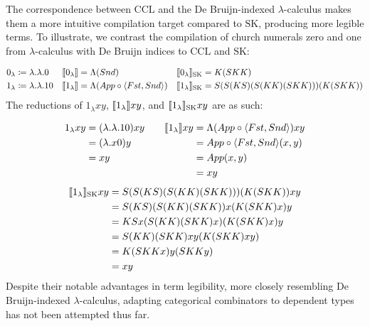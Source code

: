 \documentclass{article}
\newcommand{\ccl}{\(\text{CCL}\)} %
\newcommand{\sk}{\(\text{SK}\)}
\newcommand{\ske}{\text{SK}}
\newcommand{\la}{\langle}
\newcommand{\ra}{\rangle}
\begin{document}
The correspondence between \ccl{} and the De Bruijn-indexed \(\lambda\)-calculus makes them a more intuitive compilation target compared to \sk{}, producing more legible terms. To illustrate, we contrast the compilation of church numerals zero and one from \(\lambda\)-calculus with De Bruijn indices to \ccl{} and \sk{}:

\begin{align*}
  0_{\lambda} &\coloneq \lambda . \lambda . 0 & \cc{0_{\lambda}} &= \Lambda(Snd) & \cc[\ske]{0_{\lambda}} &= K (S K K)\\
  1_{\lambda} &\coloneq \lambda . \lambda . 1 0 & \cc{1_{\lambda}} &= \Lambda(App \circ \la Fst, Snd \ra) & \cc[\ske]{1_{\lambda}} &= S (S (K S) (S (K K) (S K K))) (K (S K K))
\end{align*}
The reductions of \(1_{\lambda} x y\), \(\cc{1_{\lambda}} x y\), and \(\cc[\ske]{1_{\lambda}} x y\) are as such:

\begin{equation*}
  \begin{aligned}[t]
    1_{\lambda} x y &= (\lambda . \lambda . 1 0) x y\\
    &= (\lambda . x 0) y\\
    &= x y
  \end{aligned}
  \qquad
  \begin{aligned}[t]
    \cc{1_{\lambda}} x y &= \Lambda(App \circ \la Fst, Snd \ra) x y\\
    &= App \circ \la Fst, Snd \ra (x, y)\\
    &= App (x, y)\\
    &= x y
  \end{aligned}
\end{equation*}
\begin{equation*}
  \begin{aligned}[t]
    \cc[\ske]{1_{\lambda}} x y &= S (S (K S) (S (K K) (S K K))) (K (S K K)) x y\\
                               &= S (K S) (S (K K) (S K K)) x (K (S K K) x) y\\
                               &= K S x (S (K K) (S K K) x) (K (S K K) x) y\\
                               &= S (K K) (S K K) x y (K (S K K) x y)\\
                               &= K (S K K x) y (S K K y)\\
                               &= x y
  \end{aligned}
\end{equation*}
Despite their notable advantages in term legibility, more closely resembling De Bruijn-indexed \(\lambda\)-calculus, adapting categorical combinators to dependent types has not been attempted thus far.
\end{document}

